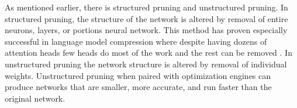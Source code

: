 As mentioned earlier, there is structured pruning and unstructured pruning. In structured pruning, the structure of the network is altered by removal of entire neurons, layers, or portions neural network. This method has proven especially successful in language model compression where despite having dozens of attention heads \cite{Vaswani2017AttentionIA} few heads do most of the work and the rest can be removed \cite{Michel2019AreSH}. In unstructured pruning the network structure is altered by removal of individual weights. Unstructured pruning when paired with optimization engines can produce networks that are smaller, more accurate, and run faster than the original network. \\